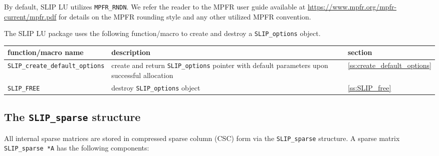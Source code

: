 \documentclass[12pt]{article}
\theoremstyle{definition}
\begin{document}
\begin{itemize}
\noindent By default, SLIP LU utilizes \verb|MPFR_RNDN|. We refer the reader to
the MPFR user guide available at
\url{https://www.mpfr.org/mpfr-current/mpfr.pdf} for details on the MPFR
rounding style and any other utilized MPFR convention.

\end{itemize}

The SLIP LU package uses the following function/macro to create and destroy a
\verb|SLIP_options| object.

\begin{center}
\begin{tabular}{lp{2.5in}l}
\hline
function/macro name & description & section \\
\hline
\verb|SLIP_create_default_options|
    & create and return \verb|SLIP_options| pointer
      with default parameters upon successful allocation
    & \ref{ss:create_default_options} \\
\hline
\verb|SLIP_FREE|
    & destroy \verb|SLIP_options| object
    & \ref{ss:SLIP_free} \\
\hline
\end{tabular}
\end{center}

\cprotect\subsection{The \verb|SLIP_sparse| structure}
\label{ss:SLIP_sparse}

All internal sparse matrices are stored in compressed sparse column (CSC)
form via the \verb|SLIP_sparse| structure. A sparse matrix
\verb|SLIP_sparse *A| has the following components:
\end{document}
